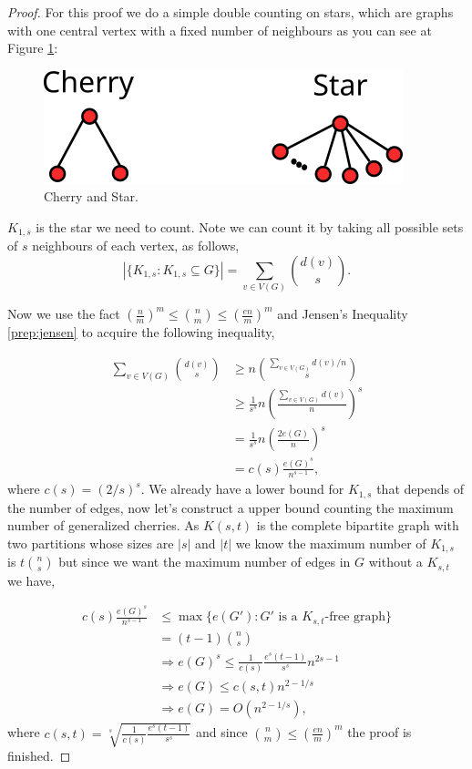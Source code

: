 \documentclass[12pt,twoside,a4paper,bibliography=totocnumbered]{book}
\numberwithin{equation}{section}
\theoremstyle{remark}
\begin{document}
\begin{proof}

For this proof we do a simple double counting on stars, which are graphs with one central vertex with a fixed number of neighbours as you can see at Figure \ref{fig:generalizedcherry}:

\begin{figure}[!htb]
     \centering
     \includegraphics[scale=1]{Figuras/cherry-and-star.png}
     \caption{Cherry and Star.}
     \label{fig:generalizedcherry}
\end{figure}

$K_{1,s}$ is the star we need to count. Note we can count it by taking all possible sets of $s$ neighbours of each vertex, as follows,
$$ |\{K_{1,s}\colon K_{1,s} \subseteq G\}| = \sum_{v \in V(G)} \binom{d(v)}{s} .$$

Now we use the fact $\left(\frac{n}{m}\right)^m \leq \binom{n}{m} \leq \left(\frac{en}{m}\right)^m$ and Jensen's Inequality \ref{prep:jensen} to acquire the following inequality,

\begin{align*} 
\sum_{v \in V(G)} \binom{d(v)}{s} & \geq n\binom{\sum_{v \in V(G)} d(v)/n}{s}\\ 
& \geq \frac{1}{s^s} n \left( \frac{\sum_{v \in V(G)} d(v)}{n} \right) ^s \\
& = \frac{1}{s^s} n \left( \frac{ 2 e(G)}{n} \right) ^s \\
& = c(s) \frac{e(G)^s}{n^{s-1}},
\end{align*}
where $c(s) = \left(2/s\right)^s$.
We already have a lower bound for $K_{1,s}$ that depends of the number of edges, now let's construct a upper bound counting the maximum number of generalized cherries.
As $K(s,t)$ is the complete bipartite graph with two partitions whose sizes are $|s|$ and $|t|$ we know the maximum number of $K_{1,s}$ is $t\binom{n}{s}$ but since we want the maximum number of edges in $G$ without a $K_{s,t}$ we have,

\begin{align*}
c(s) \frac{e(G)^s}{n^{s-1}} &\leq \max\{e(G')\colon G' \text{ is a } K_{s,t}\text{-free graph}\} \\
& = (t-1) \binom{n}{s}\\
		       & \Rightarrow e(G)^s \leq \frac{1}{c(s)}\frac{e^s(t-1)}{s^s}n^{2s-1}\\
		       &\Rightarrow e(G) \leq c(s,t) n^{2-1/s}\\
		       &\Rightarrow e(G) = O(n^{2-1/s}),
\end{align*}
where $c(s,t)= \sqrt[s]{\frac{1}{c(s)}\frac{e^s(t-1)}{s^s}}$ and since $\binom{n}{m} \leq \left(\frac{en}{m}\right)^m$ the proof is finished.
\end{proof}
\end{document}
